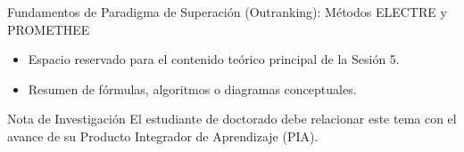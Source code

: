 \documentclass[aspectratio=169, 10pt]{beamer}
\begin{document}
\begin{frame}{Fundamentos de Paradigma de Superación (Outranking): Métodos ELECTRE y PROMETHEE}
    \begin{itemize}
        \item Espacio reservado para el contenido teórico principal de la Sesión 5.
        \item Resumen de fórmulas, algoritmos o diagramas conceptuales.
    \end{itemize}
    \begin{block}{Nota de Investigación}
        El estudiante de doctorado debe relacionar este tema con el avance de su Producto Integrador de Aprendizaje (PIA).
    \end{block}
\end{frame}
\end{document}
